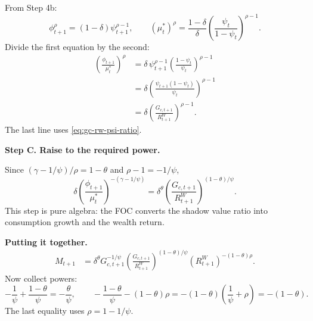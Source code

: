 \documentclass{beamer}
\begin{document}
\begin{frame}[allowframebreaks]
    From Step 4b:
    \begin{equation*}
        \phi_{t+1}^{\rho}=(1-\delta)\psi_{t+1}^{\rho-1},
        \qquad
        (\mu_t^*)^\rho=\frac{1-\delta}{\delta}\left(\frac{\psi_t}{1-\psi_t}\right)^{\rho-1}.
    \end{equation*}
    Divide the first equation by the second:
    \begin{equation*}
        \begin{aligned}
        \left(\frac{\phi_{t+1}}{\mu_t^*}\right)^\rho
        &=\delta\,\psi_{t+1}^{\rho-1}\left(\frac{1-\psi_t}{\psi_t}\right)^{\rho-1}\\
        &=\delta\left(\frac{\psi_{t+1}(1-\psi_t)}{\psi_t}\right)^{\rho-1}\\
        &=\delta\left(\frac{G_{c,t+1}}{R^W_{t+1}}\right)^{\rho-1}.
        \end{aligned}
    \end{equation*}
    The last line uses \eqref{eq:gc-rw-psi-ratio}.

    \framebreak

    \textbf{Step C. Raise to the required power.}

    Since $(\gamma-1/\psi)/\rho=1-\theta$ and $\rho-1=-1/\psi$,
    \begin{equation*}
        \boxed{
        \delta\left(\frac{\phi_{t+1}}{\mu_t^*}\right)^{-(\gamma-1/\psi)}
        =
        \delta^\theta
        \left(\frac{G_{c,t+1}}{R^W_{t+1}}\right)^{(1-\theta)/\psi}
        }.
    \end{equation*}
    This step is pure algebra: the FOC converts the shadow value ratio into consumption growth and the wealth return.

    \framebreak

    \textbf{Putting it together.}
    \begin{equation*}
        \begin{aligned}
        M_{t+1}
        &=\delta^\theta
        G_{c,t+1}^{-1/\psi}
        \left(\frac{G_{c,t+1}}{R^W_{t+1}}\right)^{(1-\theta)/\psi}
        (R^W_{t+1})^{-(1-\theta)\rho}.
        \end{aligned}
    \end{equation*}
    Now collect powers:
    \begin{equation*}
        -\frac{1}{\psi}+\frac{1-\theta}{\psi}
        =-\frac{\theta}{\psi},
        \qquad
        -\frac{1-\theta}{\psi}-(1-\theta)\rho
        =-(1-\theta)\left(\frac{1}{\psi}+\rho\right)
        =-(1-\theta).
    \end{equation*}
    The last equality uses $\rho=1-1/\psi$.


\end{frame}
\end{document}
